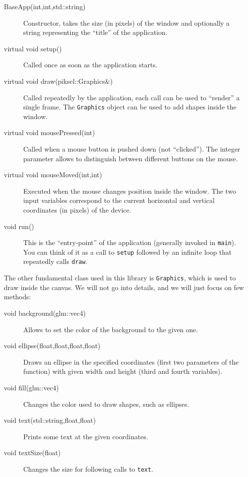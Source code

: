 \documentclass{article}
\begin{document}
\begin{description}
  \item[\ttfamily BaseApp(int,int,std::string)] Constructor, takes the size (in pixels) of the window and optionally a string representing the ``title'' of the application.
  \item[\ttfamily virtual void setup()] Called once as soon as the application starts.
  \item[\ttfamily virtual void draw(piksel::Graphics\&)] Called repeatedly by the application, each call can be used to ``render'' a single frame. The \texttt{Graphics} object can be used to add shapes inside the window.
  \item[\ttfamily virtual void mousePressed(int)] Called when a mouse button is pushed down (not ``clicked''). The integer parameter allows to distinguish between different buttons on the mouse.
  \item[\ttfamily virtual void mouseMoved(int,int)] Executed when the mouse changes position inside the window. The two input variables correspond to the current horizontal and vertical coordinates (in pixels) of the device.
  \item[void run()] This is the ``entry-point'' of the application (generally invoked in \texttt{main}). You can think of it as a call to \texttt{setup} followed by an infinite loop that repeatedly calls \texttt{draw}.
\end{description}

The other fundamental class used in this library is \texttt{Graphics}, which is used to draw inside the canvas. We will not go into details, and we will just focus on few methods:

\begin{description}
  \item[void background(glm::vec4)] Allows to set the color of the background to the given one.
  \item[void ellipse(float,float,float,float)] Draws an ellipse in the specified coordinates (first two parameters of the function) with given width and height (third and fourth variables).
  \item[void fill(glm::vec4)] Changes the color used to draw shapes, such as ellipses.
  \item[void text(std::string,float,float)] Prints some text at the given coordinates.
  \item[void textSize(float)] Changes the size for following calls to \texttt{text}.
\end{description}
\end{document}

